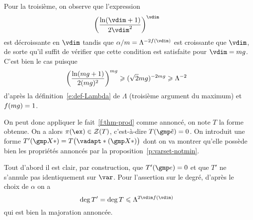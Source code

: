 Pour la troisième, on observe que l'expression
\begin{equation}
  \left( \frac{\ln(\vdim+1)}{2\vdim^2}\right)^\vdim
\end{equation}
est décroissante en \( \vdim \) tandis que \( \alpha / \puiss =
  \Lambda^{-2f(\vdim)} \) est croissante que \( \vdim \), de sorte qu'il
suffit de vérifier que cette condition est satisfaite pour \( \vdim =
  \puiss\genre \). C'est bien le cas puisque
\begin{equation} \label{e:tp-3}
  \left( \frac{\ln(mg + 1)}{2(mg)^2}\right)^{mg}
  \geqslant
  (\sqrt2 mg)^{-2mg}
  \geqslant
  \Lambda^{-2}
\end{equation}
d'après la définition~\eqref{e:def-Lambda} de \( \Lambda \) (troisième
argument du maximum) et \( f(mg) = 1 \).

On peut donc appliquer le fait~\ref{f:thm-prod} comme annoncé, on note \( T \)
la forme obtenue. On a alors \( \pi(\ex) \in \zeros T \), c'est-à-dire \(
  T(\cexa) = 0 \). On introduit une forme \( T'(\vmp*) = T\bigl(
    \vadapt*(\vmp*) \bigr) \) dont on va montrer qu'elle possède bien
les propriétés annoncés par la proposition~\ref{p:varset-notmin}.

Tout d'abord il est clair, par construction, que \( T'(\cex) = 0 \) et que \(
  T' \) ne s'annule pas identiquement sur \( \var \). Pour l'assertion sur le
degré, d'après le choix de \( \alpha \) on a
\begin{equation}
  \deg T' = \deg T \le \Lambda^{2\vdim f(\vdim)}
\end{equation}
qui est bien la majoration annoncée.

